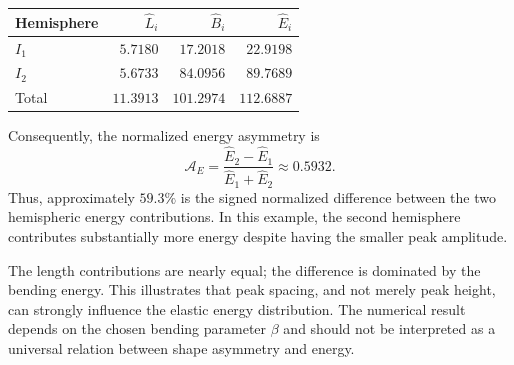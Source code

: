 \documentclass{article}
\numberwithin{tm}{section}
\numberwithin{dn}{section}
\numberwithin{as}{section}
\numberwithin{rk}{section}
\numberwithin{lem}{section}
\numberwithin{ax}{section}
\numberwithin{pp}{section}
\numberwithin{eg}{section}
\numberwithin{war}{section}
\numberwithin{equation}{section}
\numberwithin{prop}{section}
\numberwithin{nt}{section}
\numberwithin{rc}{section}
\begin{document}
\begin{center}
	\begin{tabular}{lrrr}
		\toprule
		Hemisphere & \(\widehat{L}_i\) & \(\widehat{B}_i\)
		& \(\widehat{E}_i\) \\
		\midrule
		\(I_1\) & \(5.7180\) & \(17.2018\) & \(22.9198\) \\
		\(I_2\) & \(5.6733\) & \(84.0956\) & \(89.7689\) \\
		\midrule
		Total & \(11.3913\) & \(101.2974\) & \(112.6887\) \\
		\bottomrule
	\end{tabular}
\end{center}

Consequently, the normalized energy asymmetry is
\[
\mathcal{A}_E
=
\frac{\widehat{E}_2-\widehat{E}_1}
{\widehat{E}_1+\widehat{E}_2}
\approx 0.5932.
\]
Thus, approximately \(59.3\%\) is the signed normalized
difference between the two hemispheric energy contributions.
In this example, the second hemisphere contributes substantially
more energy despite having the smaller peak amplitude.

The length contributions are nearly equal; the difference is
dominated by the bending energy. This illustrates that peak
spacing, and not merely peak height, can strongly influence the
elastic energy distribution. The numerical result depends on the
chosen bending parameter \(\beta\) and should not be interpreted
as a universal relation between shape asymmetry and energy.
\end{document}
